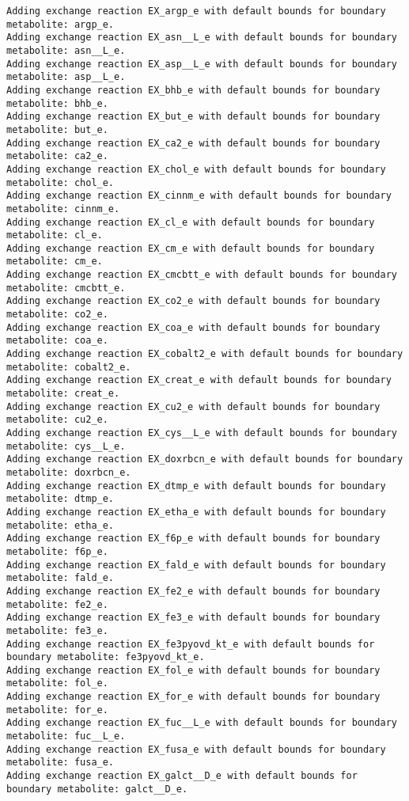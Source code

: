 \documentclass[
  letterpaper,
  DIV=11,
  numbers=noendperiod]{scrartcl}
\begin{document}
\begin{verbatim}
Adding exchange reaction EX_argp_e with default bounds for boundary metabolite: argp_e.
Adding exchange reaction EX_asn__L_e with default bounds for boundary metabolite: asn__L_e.
Adding exchange reaction EX_asp__L_e with default bounds for boundary metabolite: asp__L_e.
Adding exchange reaction EX_bhb_e with default bounds for boundary metabolite: bhb_e.
Adding exchange reaction EX_but_e with default bounds for boundary metabolite: but_e.
Adding exchange reaction EX_ca2_e with default bounds for boundary metabolite: ca2_e.
Adding exchange reaction EX_chol_e with default bounds for boundary metabolite: chol_e.
Adding exchange reaction EX_cinnm_e with default bounds for boundary metabolite: cinnm_e.
Adding exchange reaction EX_cl_e with default bounds for boundary metabolite: cl_e.
Adding exchange reaction EX_cm_e with default bounds for boundary metabolite: cm_e.
Adding exchange reaction EX_cmcbtt_e with default bounds for boundary metabolite: cmcbtt_e.
Adding exchange reaction EX_co2_e with default bounds for boundary metabolite: co2_e.
Adding exchange reaction EX_coa_e with default bounds for boundary metabolite: coa_e.
Adding exchange reaction EX_cobalt2_e with default bounds for boundary metabolite: cobalt2_e.
Adding exchange reaction EX_creat_e with default bounds for boundary metabolite: creat_e.
Adding exchange reaction EX_cu2_e with default bounds for boundary metabolite: cu2_e.
Adding exchange reaction EX_cys__L_e with default bounds for boundary metabolite: cys__L_e.
Adding exchange reaction EX_doxrbcn_e with default bounds for boundary metabolite: doxrbcn_e.
Adding exchange reaction EX_dtmp_e with default bounds for boundary metabolite: dtmp_e.
Adding exchange reaction EX_etha_e with default bounds for boundary metabolite: etha_e.
Adding exchange reaction EX_f6p_e with default bounds for boundary metabolite: f6p_e.
Adding exchange reaction EX_fald_e with default bounds for boundary metabolite: fald_e.
Adding exchange reaction EX_fe2_e with default bounds for boundary metabolite: fe2_e.
Adding exchange reaction EX_fe3_e with default bounds for boundary metabolite: fe3_e.
Adding exchange reaction EX_fe3pyovd_kt_e with default bounds for boundary metabolite: fe3pyovd_kt_e.
Adding exchange reaction EX_fol_e with default bounds for boundary metabolite: fol_e.
Adding exchange reaction EX_for_e with default bounds for boundary metabolite: for_e.
Adding exchange reaction EX_fuc__L_e with default bounds for boundary metabolite: fuc__L_e.
Adding exchange reaction EX_fusa_e with default bounds for boundary metabolite: fusa_e.
Adding exchange reaction EX_galct__D_e with default bounds for boundary metabolite: galct__D_e.

\end{verbatim}
\end{document}
